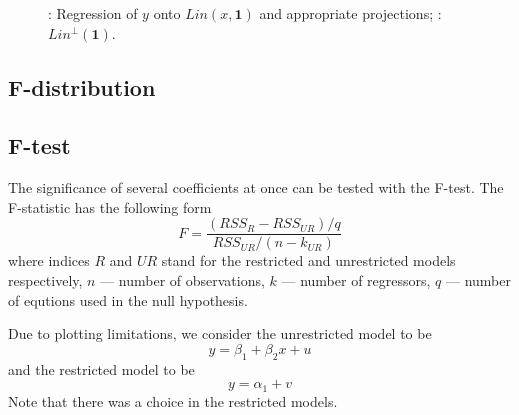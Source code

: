 \begin{figure}[ht!]
\begin{center}
\caption{: Regression of $y$ onto $Lin(x, \mathbf{1})$ and appropriate projections;
: $Lin^{\perp}(\mathbf{1})$.}
\end{center}
\end{figure}

\subsection{F-distribution}

\subsection{F-test}

The significance of several coefficients at once can be tested with the F-test.
The F-statistic has the following form
\[
F = \frac{(RSS_{R} - RSS_{UR})/q}{RSS_{UR}/(n-k_{UR})}
\]
where indices $R$ and $UR$ stand for the restricted and unrestricted models
respectively, $n$ — number of observations, $k$ — number of regressors,
$q$ — number of equtions used in the null hypothesis.

Due to plotting limitations, we consider the unrestricted model to be
\[
y = \beta_1 + \beta_2 x + u
\]
and the restricted model to be
\[
y = \alpha_1 + v
\]
Note that there was a choice in the restricted models.

